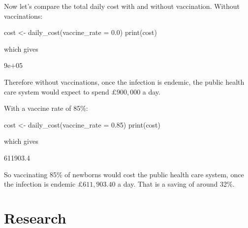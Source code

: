 Now let's compare the total daily cost with and without vaccination. Without
vaccinations:

\begin{Rin}
cost <- daily_cost(vaccine_rate = 0.0)
print(cost)
\end{Rin}

which gives

\begin{Rout}
[1] 9e+05
\end{Rout}

Therefore without vaccinations, once the infection is endemic, the public health
care system would expect to spend $\pounds 900,000$ a day.

With a vaccine rate of 85\%:

\begin{Rin}
cost <- daily_cost(vaccine_rate = 0.85)
print(cost)
\end{Rin}

which gives

\begin{Rout}
[1] 611903.4
\end{Rout}

So vaccinating 85\% of newborns would cost the public health care system, once
the infection is endemic $\pounds 611,903.40$ a day. That is a saving of around
32\%.



\section{Research}\label{sec:research}
